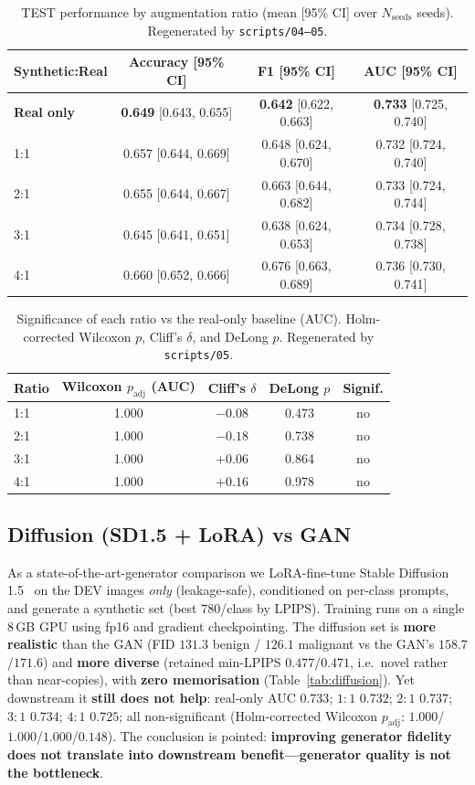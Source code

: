 \documentclass[runningheads]{llncs}
\begin{document}
\begin{table}[t]
\centering
\caption{TEST performance by augmentation ratio (mean [95\% CI] over
$N_\text{seeds}$ seeds). Regenerated by \texttt{scripts/04--05}.}
\label{tab:results}
\begin{tabular}{lccc}
\toprule
Synthetic:Real & Accuracy [95\% CI] & F1 [95\% CI] & AUC [95\% CI] \\
\midrule
\textbf{Real only} & \textbf{0.649} [0.643, 0.655] & \textbf{0.642} [0.622, 0.663] & \textbf{0.733} [0.725, 0.740] \\
1:1 & 0.657 [0.644, 0.669] & 0.648 [0.624, 0.670] & 0.732 [0.724, 0.740] \\
2:1 & 0.655 [0.644, 0.667] & 0.663 [0.644, 0.682] & 0.733 [0.724, 0.744] \\
3:1 & 0.645 [0.641, 0.651] & 0.638 [0.624, 0.653] & 0.734 [0.728, 0.738] \\
4:1 & 0.660 [0.652, 0.666] & 0.676 [0.663, 0.689] & 0.736 [0.730, 0.741] \\
\bottomrule
\end{tabular}
\end{table}

\begin{table}[t]
\centering
\caption{Significance of each ratio vs the real-only baseline (AUC).
Holm-corrected Wilcoxon $p$, Cliff's $\delta$, and DeLong $p$. Regenerated by
\texttt{scripts/05}.}
\label{tab:stats}
\begin{tabular}{lcccc}
\toprule
Ratio & Wilcoxon $p_{\text{adj}}$ (AUC) & Cliff's $\delta$ & DeLong $p$ & Signif. \\
\midrule
1:1 & 1.000 & $-0.08$ & 0.473 & no \\
2:1 & 1.000 & $-0.18$ & 0.738 & no \\
3:1 & 1.000 & $+0.06$ & 0.864 & no \\
4:1 & 1.000 & $+0.16$ & 0.978 & no \\
\bottomrule
\end{tabular}
\end{table}

\subsection{Diffusion (SD1.5 + LoRA) vs GAN}
As a state-of-the-art-generator comparison we LoRA-fine-tune Stable
Diffusion 1.5~\cite{rombach2022ldm,hu2022lora} on the DEV images \emph{only}
(leakage-safe), conditioned on per-class prompts, and generate a synthetic set
(best $780$/class by LPIPS). Training runs on a single 8\,GB GPU using fp16 and
gradient checkpointing. The diffusion set is \textbf{more realistic} than the GAN
(FID $131.3$ benign / $126.1$ malignant vs the GAN's $158.7$/$171.6$) and
\textbf{more diverse} (retained min-LPIPS $0.477$/$0.471$, i.e.\ novel rather than
near-copies), with \textbf{zero memorisation} (Table~\ref{tab:diffusion}). Yet
downstream it \textbf{still does not help}: real-only AUC $0.733$; $1{:}1$
$0.732$; $2{:}1$ $0.737$; $3{:}1$ $0.734$; $4{:}1$ $0.725$; all non-significant
(Holm-corrected Wilcoxon $p_\text{adj}$: $1.000$/$1.000$/$1.000$/$0.148$). The
conclusion is pointed: \textbf{improving generator fidelity does not translate
into downstream benefit---generator quality is not the bottleneck}.
\end{document}
